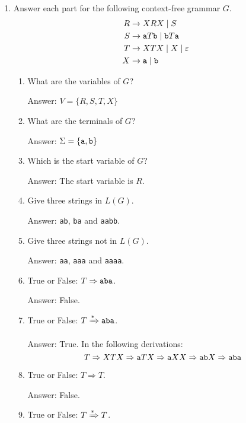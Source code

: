 \begin{enumerate}[font=\bfseries,label=2.\arabic*]
\item

Answer each part for the following context-free grammar $G$. 
\begin{align*}
R &\rightarrow XRX \mid S\\
S &\rightarrow {\tt a} T {\tt b} \mid {\tt b} T {\tt a}\\
T &\rightarrow XTX \mid X \mid \varepsilon\\
X &\rightarrow {\tt a} \mid {\tt b}
\end{align*}

\begin{enumerate}[font=\bfseries,label=\alph*.]
    \item What are the variables of $G$?
    
    Answer: $V=\{R,S,T,X\}$
    
    \item What are the terminals of $G$? 
    
    Answer: $\Sigma=\{{\tt a},{\tt b}\}$
    
    \item Which is the start variable of $G$? 
    
    Answer: The start variable is $R$.
    
    \item Give three strings in $L(G)$. 
    
    Answer: {\tt ab}, {\tt ba} and {\tt aabb}.
    
    \item Give three strings not in $L(G)$.
    
    Answer: {\tt aa}, {\tt aaa} and {\tt aaaa}.
    
    \item True or False: $T\Rightarrow {\tt aba}$.
    
    Answer: False.
    
    \item True or False: $T\xRightarrow{\ast} {\tt aba}$.
    
    Answer: True. In the following derivations: $$T\Rightarrow XTX\Rightarrow {\tt a}TX\Rightarrow {\tt a}XX\Rightarrow {\tt a}{\tt b}X\Rightarrow {\tt a}{\tt b}{\tt a}$$
    
    \item True or False: $T\Rightarrow T$.
    
    Answer: False.
    
    \item True or False: $T\xRightarrow{\ast} T $.
    

\end{enumerate}
\end{enumerate}
